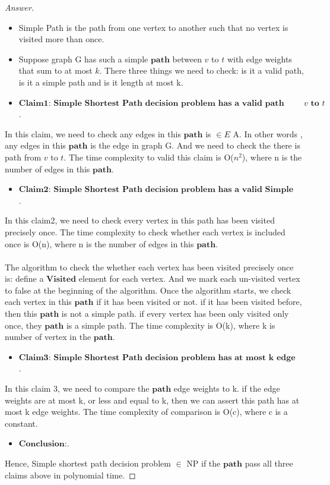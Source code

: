 \documentclass[11pt]{article}
\theoremstyle{definition}
\theoremstyle{definition}
\theoremstyle{definition}
\begin{document}
\begin{proof}[Answer]
\begin{itemize}
\item  Simple Path is the path from one vertex to another such that no vertex is visited more than once.

\item Suppose graph G has such a simple $\textbf{path}$ between $v$ to $t$  with edge weights that sum to at most $k$. There three things we need to check: is it a valid path, is it a simple path and is it length at most k.
\end{itemize}
\begin{itemize}
\item$\textbf{Claim1: Simple Shortest Path decision problem has a valid path from $v$ to $t$ }$.
\end{itemize}
In this claim, we need to check any edges in this $\textbf{path}$ is $\in E$ A. In other words , any edges in this $\textbf{path}$ is the edge in graph G. And we need to check the there is path from $v$ to $t$. The time complexity to valid this claim is O($n^2$), where n is the number of edges in this $\textbf{path}$.
\begin{itemize}
\item$\textbf{Claim2: Simple Shortest Path decision problem has a valid Simple path}$.
\end{itemize}
In this claim2, we need to check every vertex in this path has been visited precisely once.   The time complexity to check whether each vertex is included once is O(n), where n is the number of edges in this $\textbf{path}$.\\
\\The algorithm to check the whether each vertex has been visited precisely once is: define a $\textbf{Visited}$ element for each vertex. And we mark each un-visited vertex to false at the beginning of the algorithm. Once the algorithm starts, we check each vertex in this $\textbf{path}$ if it has been visited or not. if it has been visited before, then this  $\textbf{path}$ is not a simple path. if every vertex has been only visited only once, they  $\textbf{path}$ is a simple path. The time complexity is O(k), where k is number of vertex  in the  $\textbf{path}$. 
\begin{itemize}
\item$\textbf{Claim3: Simple Shortest Path decision problem has at most k edge weight}$.
\end{itemize}
In this claim 3, we need to compare the $\textbf{path}$ edge weights to k. if the edge weights are at most k, or less and equal to k, then we can assert this path has at most k edge weights. The time complexity of comparison is O(c), where c is a constant.
\begin{itemize}
\item$\textbf{Conclusion:}$.
\end{itemize}
Hence, Simple shortest path decision problem $\in$ NP if the $\textbf{path}$ pass all three claims above in polynomial time.



\end{proof}
\end{document}
